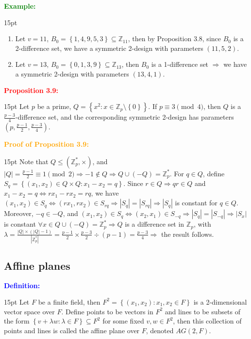 \documentclass[12pt]{article}
\newcommand{\noparskip}{\vspace{-\parskip}}
\newenvironment{points}
	{\begin{enumerate}[label = (\arabic*)]}
	{\end{enumerate}}
\newenvironment{dent}
	{\begin{adjustwidth}{15pt}{}\noparskip}
	{\end{adjustwidth}}
\newenvironment{result}[1]
	{\textcolor{Red}{\textbf{#1:}}\begin{dent}}
	{\end{dent}}
\newenvironment{proof}[1]
	{\textcolor{Orange}{\textbf{Proof of #1:}}\begin{dent}}
	{\end{dent}}
\newenvironment{definition}
	{\textcolor{Blue}{\textbf{Definition:}}\begin{dent}}
	{\end{dent}}
\newenvironment{example}
	{\textcolor{Green}{\textbf{Example:}}\begin{dent}}
	{\end{dent}}
\renewcommand{\implies}{\Rightarrow}
\renewcommand{\iff}{\Leftrightarrow}
\newcommand{\set}[1]{\left\{ #1 \right\}}
\newcommand{\sizeof}[1]{\left| #1 \right|}
\newcommand{\Z}{\mathbb{Z}}
\begin{document}
\begin{example}
\begin{points}
\item Let $v = 11$, $B_0 = \set{1, 4, 9, 5, 3} \subseteq \Z_{11}$, then by Proposition 3.8, since $B_0$ is a 2-difference set, we have a symmetric 2-design with parameters $(11, 5, 2)$.
\item Let $v = 13$, $B_0 = \set{0, 1, 3, 9} \subseteq \Z_{13}$, then $B_0$ is a 1-difference set $\implies$ we have a symmetric 2-design with parameters $(13, 4, 1)$.
\end{points}
\end{example}

\begin{result}{Proposition 3.9}
Let $p$ be a prime, $Q = \set{x^2: x \in \Z_p \setminus \set{0}}$. If $p \equiv 3 \pmod{4}$, then $Q$ is a $\frac{p - 3}{4}$-difference set, and the corresponding symmetric 2-design has parameters $\left( p, \frac{p - 1}{2}, \frac{p - 3}{4} \right)$.
\end{result}

\begin{proof}{Proposition 3.9}
Note that $Q \le (\Z_p^*, \times)$, and $\sizeof{Q} = \frac{p - 1}{2} \equiv 1 \pmod{2} \implies -1 \notin Q \implies Q \cup (-Q) = \Z_p^*$. For $q \in Q$, define $S_q = \set{(x_1, x_2) \in Q \times Q: x_1 - x_2 = q}$. Since $r \in Q \implies qr \in Q$ and $x_1 - x_2 = q \iff rx_1 - rx_2 = rq$, we have $(x_1, x_2) \in S_q \iff (rx_1, rx_2) \in S_{rq} \implies \sizeof{S_q} = \sizeof{S_{rq}} \implies \sizeof{S_q}$ is constant for $q \in Q$.
Moreover, $-q \in -Q$, and $(x_1, x_2) \in S_q \iff (x_2, x_1) \in S_{-q} \implies \sizeof{S_q} = \sizeof{S_{-q}} \implies \sizeof{S_x}$ is constant $\forall x \in Q \cup (-Q) = \Z_p^* \implies Q$ is a difference set in $\Z_p$, with $\lambda = \frac{\sizeof{Q} \times (\sizeof{Q} - 1)}{\sizeof{\Z_p^*}} = \frac{p - 1}{2} \times \frac{p - 3}{2} \div (p - 1) = \frac{p - 3}{4} \implies$ the result follows.
\end{proof}

\subsection{Affine planes}

\begin{definition}
Let $F$ be a finite field, then $F^2 = \set{(x_1, x_2): x_1, x_2 \in F}$ is a 2-dimensional vector space over $F$. Define points to be vectors in $F^2$ and lines to be subsets of the form $\set{v + \lambda w: \lambda \in F} \subseteq F^2$ for some fixed $v, w \in F^2$, then this collection of points and lines is called the affine plane over $F$, denoted $AG(2, F)$.
\end{definition}
\end{document}
